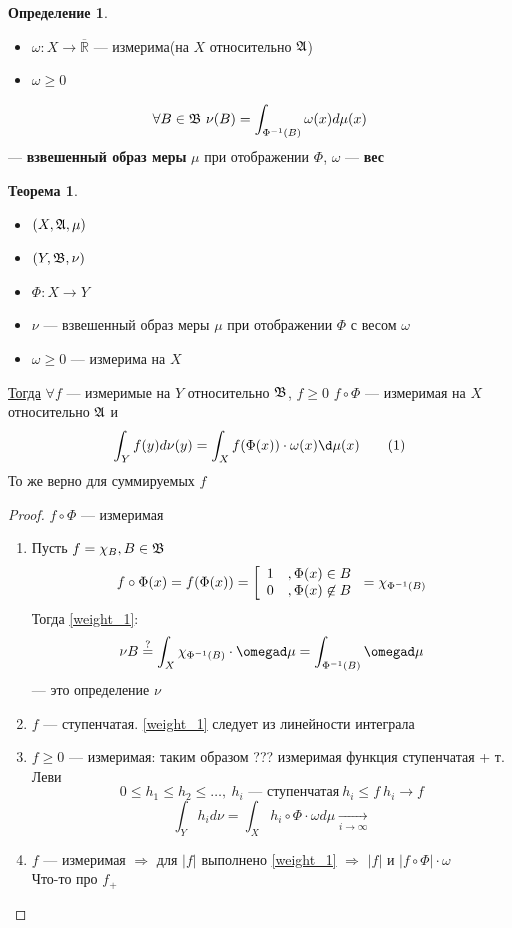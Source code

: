 \documentclass[oneside]{book}
\newcommand\addtag{\refstepcounter{equation}\tag{\theequation}}
\newcommand{\R}{\mathbb{R}}
\theoremstyle{plain}
\theoremstyle{remark}
\theoremstyle{definition}
\newtheorem{theorem}{Теорема}[section]
\newtheorem*{definition}{Определение}
\begin{document}
\begin{definition}
\-
\begin{itemize}
\item \(\omega: X\to\overline{\R}\) --- измерима(на \(X\) относительно \(\mathfrak{A}\))
\item \(\omega \ge 0\)
\end{itemize}
\[ \forall B \in \mathfrak{B}\ \nu(B) = \int_{\Phi^{-1}(B)}\omega(x)d\mu(x) \]
--- \textbf{взвешенный образ меры} \(\mu\) при отображении \(\Phi\), \(\omega\) --- \textbf{вес}
\end{definition}
\begin{theorem}
\-
\begin{itemize}
\item \((X, \mathfrak{A}, \mu)\)
\item \((Y, \mathfrak{B}, \nu)\)
\item \(\Phi: X \to Y\)
\item \(\nu\) --- взвешенный образ меры \(\mu\) при отображении \(\Phi\) с весом \(\omega\)
\item \(\omega \ge 0\) --- измерима на \(X\)
\end{itemize}
\uline{Тогда} \(\forall f\) --- измеримые на \(Y\) относительно \(\mathfrak{B}\), \(f \ge 0\) \(f\circ \Phi\) --- измеримая на \(X\) относительно \(\mathfrak{A}\) и
\[ \int_Y f(y) d\nu(y) = \int_X f(\Phi(x))\cdot\omega(x)\d\mu(x) \label{weight_1}\addtag \]
То же верно для суммируемых \(f\)
\end{theorem}
\begin{proof}
\(f\circ \Phi\) --- измеримая \\
\begin{enumerate}
\item Пусть \(f = \chi_B, B \in \mathfrak{B}\)
\[ f\circ \Phi(x) = f(\Phi(x)) = \left[\begin{array}{ll} 1 & ,\Phi(x) \in B \\ 0 & ,\Phi(x) \not\in B\end{array}\right. =\chi_{\Phi^{-1}(B)} \]
Тогда \ref{weight_1}:
\[ \nu B \overset{?}{=} \int_X \X_{\Phi^{-1}(B)}\cdot\omegad\mu = \int_{\Phi^{-1}(B)}\omegad\mu  \]
--- это определение \(\nu\)
\item \(f\) --- ступенчатая. \ref{weight_1} следует из линейности интеграла
\item \(f \ge 0\) --- измеримая: таким образом ??? измеримая функция ступенчатая + т. Леви
\[ 0 \le h_1 \le h_2 \le \dots,\ h_i\text{ --- ступенчатая}\ h_i \le f\ h_i \to f \]
\[ \int_Y h_i d\nu = \int_X h_i \circ \Phi\cdot\omega d\mu \xrightarrow[i \to \infty]{} \]
\item \(f\) --- измеримая \(\Rightarrow\) для \(|f|\) выполнено \ref{weight_1} \(\Rightarrow\) \(|f|\) и \(|f\circ \Phi|\cdot \omega\) \\
\color{red}Что-то про \(f_+\) \color{black}
\end{enumerate}
\end{proof}
\end{document}

